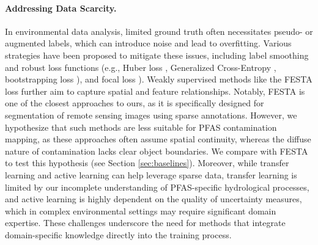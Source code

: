 \paragraph{Addressing Data Scarcity.}
In environmental data analysis, limited ground truth often necessitates pseudo- or augmented labels, which can introduce noise and lead to overfitting. Various strategies have been proposed to mitigate these issues, including label smoothing and robust loss functions (e.g., Huber loss \cite{Gokcesu_Gokcesu_2021}, Generalized Cross-Entropy \cite{Zhang_Sabuncu_2018}, bootstrapping loss \cite{Reed_Lee_Anguelov_Szegedy_Erhan_Rabinovich_2015}), and focal loss \cite{Lin_Goyal_Girshick_He_Dollár_2018}). Weakly supervised methods like the FESTA loss \cite{Hua_Marcos_Mou_Zhu_Tuia_2022} further aim to capture spatial and feature relationships. %
Notably, FESTA is one of the closest approaches to ours, as it is specifically designed for segmentation of remote sensing images using sparse annotations. However, we hypothesize that such methods are less suitable for PFAS contamination mapping, as these approaches often assume spatial continuity, whereas the diffuse nature of contamination lacks clear object boundaries. We compare with FESTA to test this hypothesis (see Section \ref{sec:baselines}). 
Moreover, while transfer learning and active learning \cite{Li_Wang_Chen_Lu_Fu_Wu_2024} can help leverage sparse data, transfer learning is limited by our incomplete understanding of PFAS-specific hydrological processes, and active learning is highly dependent on the quality of uncertainty measures, which in complex environmental settings may require significant domain expertise. These challenges underscore the need for methods that integrate domain-specific knowledge directly into the training process.
